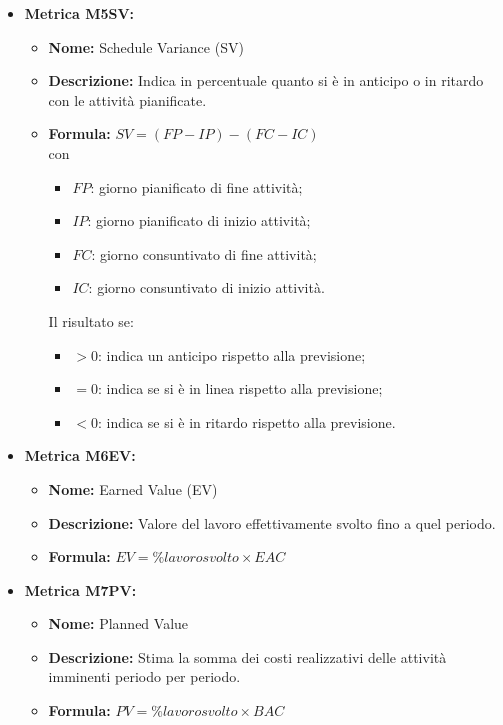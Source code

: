 \begin{itemize}
    \item \textbf{Metrica M5SV:}
          \begin{itemize}
              \item \textbf{Nome:} Schedule Variance (SV)
              \item \textbf{Descrizione:} Indica in percentuale quanto si è in anticipo o in ritardo con le attività pianificate.
              \item \textbf{Formula:} $SV = (FP - IP) - (FC - IC)$
              \\con \begin{itemize}
                \item $FP$: giorno pianificato di fine attività;
                \item $IP$: giorno pianificato di inizio attività;
                \item $FC$: giorno consuntivato di fine attività;
                \item $IC$: giorno consuntivato di inizio attività.
            \end{itemize}
            
            Il risultato se:
            \begin{itemize}
                \item $> 0$: indica un anticipo rispetto alla previsione;
                \item $= 0$: indica se si è in linea rispetto alla previsione;
                \item $< 0$: indica se si è in ritardo rispetto alla previsione.
            \end{itemize}
          \end{itemize}

    \item \textbf{Metrica M6EV:}
          \begin{itemize}
              \item \textbf{Nome:} Earned Value (EV)
              \item \textbf{Descrizione:} Valore del lavoro effettivamente svolto fino a quel periodo.
              \item \textbf{Formula:} $EV = \% lavoro svolto \times EAC$
          \end{itemize}

    \item \textbf{Metrica M7PV:}
          \begin{itemize}
              \item \textbf{Nome:} Planned Value
              \item \textbf{Descrizione:} Stima la somma dei costi realizzativi delle attività imminenti periodo per periodo.
              \item \textbf{Formula:} $PV = \% lavoro svolto \times BAC$
          \end{itemize}


\end{itemize}
